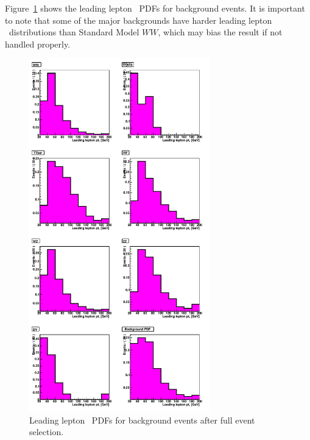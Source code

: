 Figure~\ref{fig:bkgpdfs} shows the leading lepton \pt\ PDFs
for background events. It is important to note that some of the major
backgrounds have harder leading lepton \pt\ distributions than Standard
Model $WW$, which may bias the result if not handled properly.

\begin{figure}[tp]
  \centerline{
    \includegraphics[width=0.7\textwidth]{figures/pdf_mc_all.pdf}
  }

  \caption[Background PDFs] {Leading lepton \pt\ PDFs for background
  events after full event selection.} \label{fig:bkgpdfs}
\end{figure}
